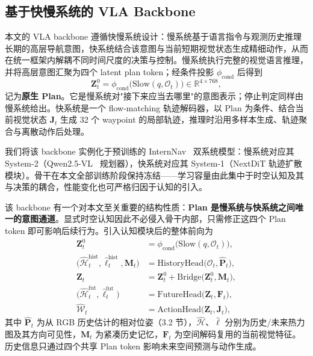 \documentclass[10pt]{ctexart}
\begin{document}
\subsection{基于快慢系统的 VLA Backbone}
\label{sec:backbone}

本文的 VLA backbone 遵循快慢系统设计：慢系统基于语言指令与观测历史推理长期的高层导航意图，快系统结合该意图与当前短期视觉状态生成精细动作，从而在统一框架内解耦不同时间尺度的决策与控制。慢系统执行完整的视觉语言推理，并将高层意图汇聚为四个 latent plan token；经条件投影 $\phi_{\mathrm{cond}}$ 后得到
\[
\mathbf{Z}^{0}_t
=
\phi_{\mathrm{cond}}
\bigl(
\mathrm{Slow}(q,\mathcal{O}_t)
\bigr)
\in
\mathbb{R}^{4\times768},
\]
记为\textbf{原生 Plan}。它是慢系统对"接下来应当去哪里"的意图表示；停止判定同样由慢系统给出。快系统是一个 flow-matching 轨迹解码器，以 Plan 为条件、结合当前视觉状态 $\mathbf{J}_t$ 生成 32 个 waypoint 的局部轨迹，推理时沿用多样本生成、轨迹聚合与离散动作后处理。

我们将该 backbone 实例化于预训练的 InternNav~\cite{internnav} 双系统模型：慢系统对应其 System-2（Qwen2.5-VL~\cite{qwen25vl} 规划器），快系统对应其 System-1（NextDiT 轨迹扩散模块）。骨干在本文全部训练阶段保持冻结——学习容量由此集中于时空认知及其与决策的耦合，性能变化也可严格归因于认知的引入。

该 backbone 有一个对本文至关重要的结构性质：\textbf{Plan 是慢系统与快系统之间唯一的意图通道}。显式时空认知因此不必侵入骨干内部，只需修正这四个 Plan token 即可影响后续行为。引入认知模块后的整体前向为
\begin{equation}
\begin{aligned}
\mathbf{Z}^{0}_t
&=
\phi_{\mathrm{cond}}
\bigl(
\mathrm{Slow}(q,\mathcal{O}_t)
\bigr),\\
\bigl(
\widehat{\mathcal{H}}^{\mathrm{hist}}_t,
\widehat{\bm{\ell}}^{\mathrm{hist}}_t,
\mathbf{M}_t
\bigr)
&=
\mathrm{HistoryHead}
\bigl(
\mathcal{O}_t,\widehat{\mathbf{P}}_t
\bigr),\\
\mathbf{Z}_t
&=
\mathbf{Z}^{0}_t+
\mathrm{Bridge}
\bigl(
\mathbf{Z}^{0}_t,\mathbf{M}_t
\bigr),\\
\bigl(
\widehat{\mathcal{H}}^{\mathrm{fut}}_t,
\widehat{\bm{\ell}}^{\mathrm{fut}}_t
\bigr)
&=
\mathrm{FutureHead}
\bigl(
\mathbf{Z}_t,\mathbf{F}_t
\bigr),\\
\widehat{\mathcal{W}}_t
&=
\mathrm{ActionHead}
\bigl(
\mathbf{Z}_t,\mathbf{J}_t
\bigr),
\end{aligned}
\label{eq:overview}
\end{equation}
其中 $\widehat{\mathbf{P}}_t$ 为从 RGB 历史估计的相对位姿（3.2 节），$\widehat{\mathcal{H}}$、$\widehat{\bm{\ell}}$ 分别为历史/未来热力图及其方向可见性，$\mathbf{M}_t$ 为紧凑历史记忆，$\mathbf{F}_t$ 为空间解码复用的当前视觉特征。历史信息只通过四个共享 Plan token 影响未来空间预测与动作生成。
\end{document}
